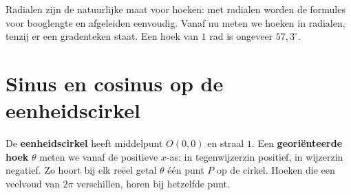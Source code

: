Radialen zijn de natuurlijke maat voor hoeken: met radialen worden de formules voor booglengte en afgeleiden eenvoudig. Vanaf nu meten we hoeken in radialen, tenzij er een gradenteken staat. Een hoek van $1$ rad is ongeveer $57{,}3^\circ$.



\begin{oefeningen}

\end{oefeningen}

\section{Sinus en cosinus op de eenheidscirkel}

De \textbf{eenheidscirkel} heeft middelpunt $O(0, 0)$ en straal $1$. Een \textbf{georiënteerde hoek} $\theta$ meten we vanaf de positieve $x$-as: in tegenwijzerzin positief, in wijzerzin negatief. Zo hoort bij elk reëel getal $\theta$ één punt $P$ op de cirkel. Hoeken die een veelvoud van $2\pi$ verschillen, horen bij hetzelfde punt.

